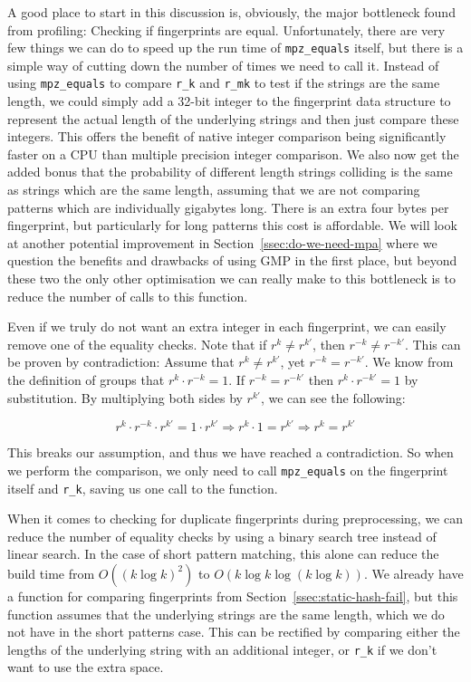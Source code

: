 \documentclass[ %
                    author={Dominic Joseph Moylett},
                    degree={MEng},
                     title={Dictionary Matching with Fingerprints},
                  subtitle={An Empirical Analysis},
                      type={research},
                      year={2015} ]{dissertation}
\begin{document}
A good place to start in this discussion is, obviously, the major bottleneck found from profiling: Checking if fingerprints are equal. Unfortunately, there are very few things we can do to speed up the run time of \texttt{mpz\_equals} itself, but there is a simple way of cutting down the number of times we need to call it. Instead of using \texttt{mpz\_equals} to compare \texttt{r\_k} and \texttt{r\_mk} to test if the strings are the same length, we could simply add a 32-bit integer to the fingerprint data structure to represent the actual length of the underlying strings and then just compare these integers. This offers the benefit of native integer comparison being significantly faster on a CPU than multiple precision integer comparison. We also now get the added bonus that the probability of different length strings colliding is the same as strings which are the same length, assuming that we are not comparing patterns which are individually gigabytes long. There is an extra four bytes per fingerprint, but particularly for long patterns this cost is affordable. We will look at another potential improvement in Section~\ref{ssec:do-we-need-mpa} where we question the benefits and drawbacks of using GMP in the first place, but beyond these two the only other optimisation we can really make to this bottleneck is to reduce the number of calls to this function.

Even if we truly do not want an extra integer in each fingerprint, we can easily remove one of the equality checks. Note that if $r^k \neq r^{k'}$, then $r^{-k} \neq r^{-k'}$. This can be proven by contradiction: Assume that $r^k \neq r^{k'}$, yet $r^{-k} = r^{-k'}$. We know from the definition of groups \cite[p 250]{katz} that $r^k \cdot r^{-k} = 1$. If $r^{-k} = r^{-k'}$ then $r^k \cdot r^{-k'} = 1$ by substitution. By multiplying both sides by $r^{k'}$, we can see the following:

$$r^k \cdot r^{-k} \cdot r^{k'} = 1 \cdot r^{k'} \Rightarrow r^k \cdot 1 = r^{k'} \Rightarrow r^k = r^{k'}$$

This breaks our assumption, and thus we have reached a contradiction. So when we perform the comparison, we only need to call \texttt{mpz\_equals} on the fingerprint itself and \texttt{r\_k}, saving us one call to the function.

When it comes to checking for duplicate fingerprints during preprocessing, we can reduce the number of equality checks by using a binary search tree instead of linear search. In the case of short pattern matching, this alone can reduce the build time from $O((k\log k)^2)$ to $O(k\log k\log(k\log k))$. We already have a function for comparing fingerprints from Section~\ref{ssec:static-hash-fail}, but this function assumes that the underlying strings are the same length, which we do not have in the short patterns case. This can be rectified by comparing either the lengths of the underlying string with an additional integer, or \texttt{r\_k} if we don't want to use the extra space.
\end{document}
